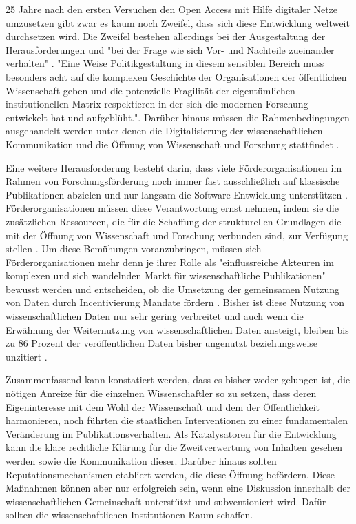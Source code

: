 25 Jahre nach den ersten Versuchen den Open Access mit Hilfe digitaler Netze umzusetzen gibt zwar es kaum noch Zweifel, dass sich diese Entwicklung weltweit durchsetzen wird. Die Zweifel bestehen allerdings bei der Ausgestaltung der Herausforderungen und "bei der Frage wie sich Vor- und Nachteile zueinander verhalten" \cite{hagner_2015_sache_buches}. "Eine Weise Politikgestaltung in diesem sensiblen Bereich muss besonders acht auf die komplexen Geschichte der Organisationen der öffentlichen Wissenschaft geben und die potenzielle Fragilität der eigentümlichen institutionellen Matrix respektieren in der sich die modernen Forschung entwickelt hat und aufgeblüht."\cite{david1998_common}. Darüber hinaus müssen die Rahmenbedingungen ausgehandelt werden unter denen die Digitalisierung der wissenschaftlichen Kommunikation und die Öffnung von Wissenschaft und Forschung stattfindet \cite{mennes_2013_making_os}.

Eine weitere Herausforderung besteht darin, dass viele Förderorganisationen im Rahmen von Forschungsförderung noch immer fast ausschließlich auf klassische Publikationen abzielen und nur langsam die Software-Entwicklung unterstützen \cite{hey_2015_open}. Förderorganisationen müssen diese Verantwortung ernst nehmen, indem sie die zusätzlichen Ressourcen, die für die Schaffung der strukturellen Grundlagen die mit der Öffnung von Wissenschaft und Forschung verbunden sind, zur Verfügung stellen \cite{mennes_2013_making_os} \cite{patlak_2010_open}. Um diese Bemühungen voranzubringen, müssen sich Förderorganisationen mehr denn je ihrer Rolle als "einflussreiche  Akteuren  im  komplexen und  sich  wandelnden  Markt  für  wissenschaftliche  Publikationen" \cite{wein_2010_erwerbung} bewusst werden und entscheiden, ob die Umsetzung der gemeinsamen Nutzung von Daten durch Incentivierung Mandate fördern \cite{mennes_2013_making_os}. Bisher ist diese Nutzung von wissenschaftlichen Daten nur sehr gering verbreitet und auch wenn die Erwähnung der Weiternutzung von wissenschaftlichen Daten ansteigt, bleiben bis zu 86 Prozent der veröffentlichen Daten bisher ungenutzt beziehungsweise unzitiert \cite{peters_2015_research}.

Zusammenfassend kann konstatiert werden, dass es bisher weder gelungen ist, die nötigen Anreize für die einzelnen Wissenschaftler so zu setzen, dass deren Eigeninteresse mit dem Wohl der Wissenschaft und dem der Öffentlichkeit harmonieren, noch führten die staatlichen Interventionen zu einer fundamentalen Veränderung im Publikationsverhalten. Als Katalysatoren für die Entwicklung kann die klare rechtliche Klärung für die Zweitverwertung von Inhalten gesehen werden sowie die Kommunikation dieser. Darüber hinaus sollten Reputationsmechanismen etabliert werden, die diese Öffnung befördern. Diese Maßnahmen können aber nur erfolgreich sein, wenn eine Diskussion innerhalb der wissenschaftlichen Gemeinschaft unterstützt und subventioniert wird. Dafür sollten die wissenschaftlichen Institutionen Raum schaffen.

